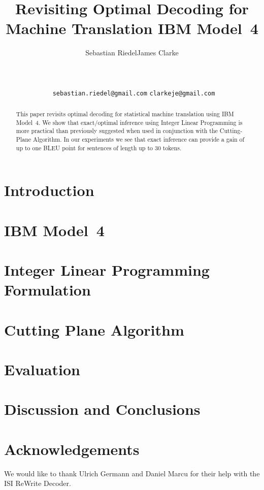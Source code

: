 \documentclass[english,11pt]{article}
\title{Revisiting Optimal Decoding for Machine Translation IBM Model~4}
\author{
Sebastian Riedel\footnotemark[1] \footnotemark[2]    \qquad James Clarke\footnotemark[3]  \\
\footnotemark[1]  {Department of Computer Science, University of Tokyo, Japan}\\
\footnotemark[2]  {Database Center for Life Science, Research
Organization of Information and System, Japan}\\
\footnotemark[3]  {Department of Computer Science, University of Illinois at Urbana-Champaign, Urbana, IL 61801}\\
\
\footnotemark[1]  \texttt{sebastian.riedel@gmail.com} \qquad \footnotemark[2] \texttt{clarkeje@gmail.com}
}
\date{}
\theoremstyle{plain}
\theoremstyle{plain}
\theoremstyle{plain}
\begin{document}
\setlength{\pdfpageheight}{\paperheight}
\setlength{\pdfpagewidth}{\paperwidth}
\maketitle
\begin{abstract}
  This paper revisits optimal decoding for statistical machine
  translation using IBM Model~4.  We show that exact/optimal inference
  using Integer Linear Programming is more practical than previously
  suggested when used in conjunction with the Cutting-Plane Algorithm.
  In our experiments we see that exact inference can provide a gain of
  up to one BLEU point for sentences of length up to 30 tokens.
\end{abstract}

\section{Introduction}
\label{sec:introduction}


\section{IBM Model~4} 
\label{sec:ibm-model-4}
 
 
\section{Integer Linear Programming Formulation}
\label{sec:ilp}


\section{Cutting Plane Algorithm}
\label{sec:cutting-plane}


\section{Evaluation}
\label{sec:evaluation}


\section{Discussion and Conclusions}
\label{sec:conclusion}


\section*{Acknowledgements}
We would like to thank Ulrich Germann and Daniel Marcu for their help
with the ISI ReWrite Decoder.


 
\footnotesize

\end{document}
